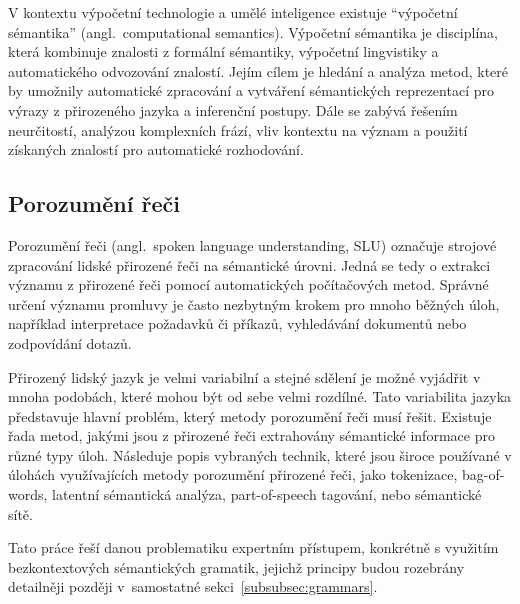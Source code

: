 V kontextu výpočetní technologie a umělé inteligence existuje \enquote{výpočetní sémantika} (angl.~computational semantics).
Výpočetní sémantika je disciplína, která kombinuje znalosti z formální sémantiky, výpočetní lingvistiky a automatického odvozování znalostí.
Jejím cílem je hledání a analýza metod, které by umožnily automatické zpracování a vytváření
sémantických reprezentací pro výrazy z přirozeného jazyka a inferenční postupy.
Dále se zabývá řešením neurčitostí, analýzou komplexních frází,
vliv kontextu na význam a použití získaných znalostí pro automatické rozhodování.~\cite{computational-semantics-blackburn-bos}~\cite{computation-semantics}

\subsection{Porozumění řeči}
Porozumění řeči (angl.~spoken language understanding, SLU) označuje strojové zpracování lidské přirozené řeči na sémantické úrovni.
Jedná se tedy o extrakci významu z přirozené řeči pomocí automatických počítačových metod.
Správné určení významu promluvy je často nezbytným krokem pro mnoho běžných úloh, například interpretace požadavků či příkazů,
vyhledávání dokumentů nebo zodpovídání dotazů.~\cite{the_conversational_interface}

Přirozený lidský jazyk je velmi variabilní a stejné sdělení je možné vyjádřit v mnoha podobách, které mohou být od sebe velmi rozdílné.
Tato variabilita jazyka představuje hlavní problém, který metody porozumění řeči musí řešit.
Existuje řada metod, jakými jsou z přirozené řeči extrahovány sémantické informace pro různé typy úloh.
Následuje popis vybraných technik, které jsou široce používané v úlohách využívajících
metody porozumění přirozené řeči, jako tokenizace, bag-of-words, latentní sémantická analýza, part-of-speech tagování, nebo sémantické sítě.~\cite{the_conversational_interface}

Tato práce řeší danou problematiku expertním přístupem, konkrétně s využitím bezkontextových sémantických gramatik,
jejichž principy budou rozebrány detailněji později v~samostatné sekci~\ref{subsubsec:grammars}.

